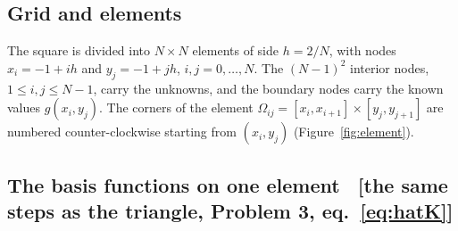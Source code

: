 \documentclass[11pt]{article}
\newcommand{\Om}{\Omega}
\newcommand{\src}[1]{{\small\color{black!55}\textsf{[#1]}}}
\begin{document}
\subsection*{Grid and elements}

The square is divided into $N\times N$ elements of side $h=2/N$, with nodes
$x_{i}=-1+ih$ and $y_{j}=-1+jh$, $i,j=0,\dots,N$.  The $(N-1)^{2}$ interior
nodes, $1\le i,j\le N-1$, carry the unknowns, and the boundary nodes carry the
known values $g(x_{i},y_{j})$.  The corners of the element
$\Om_{ij}=[x_{i},x_{i+1}]\times[y_{j},y_{j+1}]$ are numbered
counter-clockwise starting from $(x_{i},y_{j})$ (Figure~\ref{fig:element}).

\subsection*{The basis functions on one element
  \ \src{the same steps as the triangle, Problem 3, eq.~\eqref{eq:hatK}}}
\end{document}
